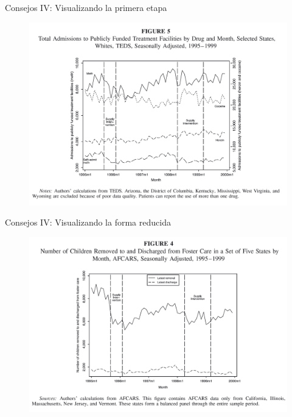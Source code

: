 \documentclass{beamer}
\begin{document}
\begin{frame}{Consejos IV: Visualizando la primera etapa}
	
	\begin{figure}
	\includegraphics[scale=0.15]{./lecture_includes/keith_3.png}
	\end{figure}
	
\end{frame}

\begin{frame}{Consejos IV: Visualizando la forma reducida}
	
	\begin{figure}
	\includegraphics[scale=0.15]{./lecture_includes/keith_2.png}
	\end{figure}
	
\end{frame}
\end{document}
